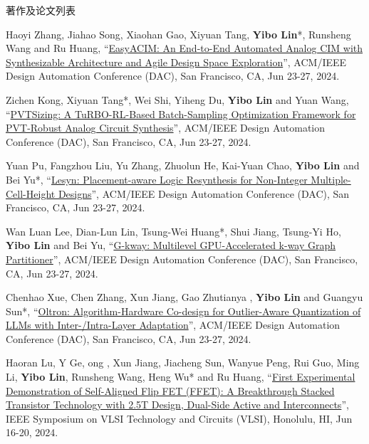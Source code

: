 \begin{rSection}{著作及论文列表}
\begin{description}[font=\normalfont, rightmargin=2em]
\item[{[C153]}]{
        Haoyi Zhang, Jiahao Song, Xiaohan Gao, Xiyuan Tang, \textbf{Yibo Lin}*, Runsheng Wang and Ru Huang, 
    ``\href{https://doi.org/10.1145/3649329.3656229}{EasyACIM: An End-to-End Automated Analog CIM with Synthesizable Architecture and Agile Design Space Exploration}'', 
    ACM/IEEE Design Automation Conference (DAC), San Francisco, CA, Jun 23-27, 2024.
    
}
            

\item[{[C152]}]{
        Zichen Kong, Xiyuan Tang*, Wei Shi, Yiheng Du, \textbf{Yibo Lin} and Yuan Wang, 
    ``\href{https://doi.org/10.1145/3649329.3661850}{PVTSizing: A TuRBO-RL-Based Batch-Sampling Optimization Framework for PVT-Robust Analog Circuit Synthesis}'', 
    ACM/IEEE Design Automation Conference (DAC), San Francisco, CA, Jun 23-27, 2024.
    
}
            

\item[{[C151]}]{
        Yuan Pu, Fangzhou Liu, Yu Zhang, Zhuolun He, Kai-Yuan Chao, \textbf{Yibo Lin} and Bei Yu*, 
    ``\href{https://doi.org/10.1145/3649329.3656243}{Lesyn: Placement-aware Logic Resynthesis for Non-Integer Multiple-Cell-Height Designs}'', 
    ACM/IEEE Design Automation Conference (DAC), San Francisco, CA, Jun 23-27, 2024.
    
}
            

\item[{[C150]}]{
        Wan Luan Lee, Dian-Lun Lin, Tsung-Wei Huang*, Shui Jiang, Tsung-Yi Ho, \textbf{Yibo Lin} and Bei Yu, 
    ``\href{https://doi.org/10.1145/3649329.3656238}{G-kway: Multilevel GPU-Accelerated k-way Graph Partitioner}'', 
    ACM/IEEE Design Automation Conference (DAC), San Francisco, CA, Jun 23-27, 2024.
    
}
            

\item[{[C149]}]{
        Chenhao Xue, Chen Zhang, Xun Jiang,  Gao Zhutianya , \textbf{Yibo Lin} and Guangyu Sun*, 
    ``\href{https://doi.org/10.1145/3649329.3656221}{Oltron: Algorithm-Hardware Co-design for Outlier-Aware Quantization of LLMs with Inter-/Intra-Layer Adaptation}'', 
    ACM/IEEE Design Automation Conference (DAC), San Francisco, CA, Jun 23-27, 2024.
    
}
            

\item[{[C148]}]{
        Haoran Lu, Y Ge, ong , Xun Jiang, Jiacheng Sun, Wanyue Peng, Rui Guo, Ming Li, \textbf{Yibo Lin}, Runsheng Wang, Heng Wu* and Ru Huang, 
    ``\href{https://doi.org/10.1109/VLSITechnologyandCir46783.2024.10631460}{First Experimental Demonstration of Self-Aligned Flip FET (FFET): A Breakthrough Stacked Transistor Technology with 2.5T Design, Dual-Side Active and Interconnects}'', 
    IEEE Symposium on VLSI Technology and Circuits (VLSI), Honolulu, HI, Jun 16-20, 2024.
    
}
\end{description}
\end{rSection}
